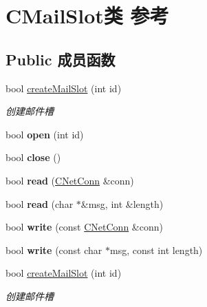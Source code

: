 \hypertarget{class_c_mail_slot}{}\section{C\+Mail\+Slot类 参考}
\label{class_c_mail_slot}
\subsection*{Public 成员函数}
\begin{DoxyCompactItemize}
\item 
bool \hyperlink{class_c_mail_slot_abdbc8ae85a1ae1f7c7998c43b1422535}{create\+Mail\+Slot} (int id)
\begin{DoxyCompactList}\small\item\em 创建邮件槽 \end{DoxyCompactList}\item 
\mbox{\label{class_c_mail_slot_a23a09f6261450e62570ee1314c62eb97}} 
bool {\bfseries open} (int id)
\item 
\mbox{\label{class_c_mail_slot_afc370072c2ab921ba66c55d1509262ad}} 
bool {\bfseries close} ()
\item 
\mbox{\label{class_c_mail_slot_a8eb1b3b7bd937365ca865d76e25a4941}} 
bool {\bfseries read} (\hyperlink{class_c_net_conn}{C\+Net\+Conn} \&conn)
\item 
\mbox{\label{class_c_mail_slot_a17b53bd1601b38ba99bac0dda7ac0794}} 
bool {\bfseries read} (char $\ast$\&msg, int \&length)
\item 
\mbox{\label{class_c_mail_slot_a5eb6d0ece129a9c023cd058f45653427}} 
bool {\bfseries write} (const \hyperlink{class_c_net_conn}{C\+Net\+Conn} \&conn)
\item 
\mbox{\label{class_c_mail_slot_add3c2a84d9d2e588f23e009c08c0ca2d}} 
bool {\bfseries write} (const char $\ast$msg, const int length)
\item 
bool \hyperlink{class_c_mail_slot_abdbc8ae85a1ae1f7c7998c43b1422535}{create\+Mail\+Slot} (int id)
\begin{DoxyCompactList}\small\item\em 创建邮件槽 \end{DoxyCompactList}\item 

\end{DoxyCompactItemize}
